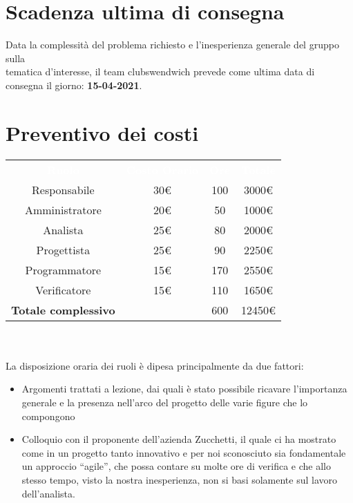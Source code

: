 \section{Scadenza ultima di consegna}
Data la complessità del problema richiesto e l'inesperienza generale del gruppo sulla \\
tematica d'interesse, il team clubswendwich prevede come ultima data di consegna 
il giorno: \textbf{15-04-2021}.

\section{Preventivo dei costi}
{\renewcommand{\arraystretch}{1.5}
\begin{tabular}{cccc}
	\rowcolor[RGB]{33, 73, 50}
	\textcolor{white}{\textbf{Ruolo}} & \textcolor{white}{\textbf{Costo Orario}} 
    & \textcolor{white}{\textbf{Ore}} & \textcolor{white}{\textbf{Totale}}\\
	\rowcolor[RGB]{216, 235, 171}
	Responsabile & 30€ & 100 & 3000€     			\\
	\rowcolor[RGB]{233, 245, 206}
	Amministratore & 20€ & 50 & 1000€    			\\
    \rowcolor[RGB]{216, 235, 171}
	Analista & 25€ & 80 & 2000€          			\\
	\rowcolor[RGB]{233, 245, 206}
	Progettista & 25€ & 90 & 2250€       			\\
    \rowcolor[RGB]{216, 235, 171}
	Programmatore & 15€ & 170 & 2550€     			\\
	\rowcolor[RGB]{233, 245, 206}
	Verificatore & 15€ & 110 & 1650€      			\\
	\rowcolor[RGB]{216, 235, 171}
	\textbf{Totale complessivo} & & 600 & 12450€    \\
\end{tabular}	
}
\\\\
La disposizione oraria dei ruoli è dipesa principalmente da due fattori:
\begin{itemize}
	\item Argomenti trattati a lezione, dai quali è stato possibile ricavare l'importanza generale e la presenza nell'arco del progetto delle varie figure che lo compongono
	\item Colloquio con il proponente dell'azienda Zucchetti, il quale ci ha mostrato come in un progetto tanto innovativo e per noi sconosciuto sia fondamentale un approccio ``agile'', che possa contare su molte ore di verifica e che allo stesso tempo, visto la nostra inesperienza, non si basi solamente sul lavoro dell'analista.
\end{itemize}

